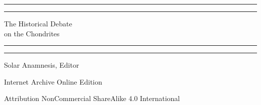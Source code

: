 \documentclass[a4paper, 12pt, oneside]{article}
\begin{document}
\begin{titlepage} %
	\centering %
	\scshape %

	
	\rule{\textwidth}{1.6pt}\vspace*{-\baselineskip}\vspace*{2pt} %
	\rule{\textwidth}{0.4pt} %
	
	\vspace{0.75\baselineskip} %
	
	{\LARGE The Historical Debate\\[0.5cm] on the Chondrites} %
	
	\vspace{0.75\baselineskip} %
	
	\rule{\textwidth}{0.4pt}\vspace*{-\baselineskip}\vspace{3.2pt} %
	\rule{\textwidth}{1.6pt} %
	
	\vspace{1\baselineskip} %
	
	
	{Solar Anamnesis, Editor\\} %
	
	\vspace*{1\baselineskip} %
	

		
	\vspace*{\fill}%
	
	\vspace{1\baselineskip} %

    Internet Archive Online Edition  %
	
	{\small Attribution NonCommercial ShareAlike 4.0 International } %
\end{titlepage}
\setlength{\parskip}{1mm plus1mm minus1mm}
\setcounter{tocdepth}{3}
\setcounter{secnumdepth}{4}
\tableofcontents
\clearpage
\listoffigures
\clearpage
\end{document}
